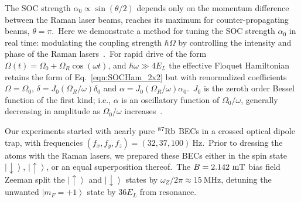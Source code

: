 \documentclass[twocolumn,amsmath,amssymb,floatfix,prl]{revtex4-1}
\def\Rb87{^{87}\rm{Rb}}					%
\newcommand{\ket}[1]{\left|#1\right>}
\begin{document}
The SOC strength ${\alpha_0\propto \sin(\theta/2)}$ depends only on the momentum difference between the Raman laser beams, reaches its maximum for counter-propagating beams, $\theta = \pi$.~Here we demonstrate a method for tuning the SOC strength $\alpha_0$ in real time: modulating the coupling strength $\hbar\Omega$ by controlling the intensity and phase of the Raman lasers~\cite{Juzeliunas2012,Zhang2011,Balaz2012, Struck2012}.~For rapid drive of the form $\Omega(t) = \Omega_0 + \Omega_R \cos(\omega t)$, and $\hbar \omega \gg 4 E_L$ the effective Floquet Hamiltonian retains the form of Eq.~\ref{eqn:SOCHam_2x2} but with renormalized coefficients $\Omega = \Omega_0$, $\delta = J_0 (\Omega_R / \omega) \delta_0$ and $\alpha = J_0 (\Omega_R / \omega) \alpha_0$.~$J_0$ is the zeroth order Bessel function of the first kind; i.e., $\alpha$ is an oscillatory function of $\Omega_0 / \omega$, generally decreasing in amplitude as $\Omega_0 / \omega$ increases~\cite{Zhang2011}.~

Our experiments started with nearly pure $\Rb87$ BECs in a crossed optical dipole trap, with frequencies $(f_x, f_y, f_z)=(32, 37, 100)~$Hz.~Prior to dressing the atoms with the Raman lasers, we prepared these BECs either in the spin state $\ket{\downarrow}$, $\ket{\uparrow}$, or an equal superposition thereof.~The $B=2.142~{\rm mT}$ bias field Zeeman split the $\ket{\uparrow}$ and $\ket{ \downarrow }$ states by $ \omega_Z /2\pi \approx 15~$MHz, detuning the unwanted $\ket{m_F = +1}$ state by $36 E_L$ from resonance.
\end{document}
